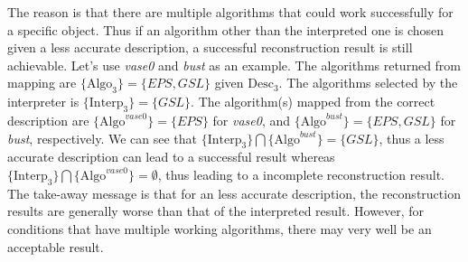 The reason is that there are multiple algorithms that could work successfully for a specific object. Thus if an algorithm other than the interpreted one is chosen given a less accurate description, a successful reconstruction result is still achievable. Let's use \textit{vase0} and \textit{bust} as an example. The algorithms returned from mapping are $\{\text{Algo}_3\}=\{EPS, GSL\}$ given $\text{Desc}_3$. The algorithms selected by the interpreter is $\{\text{Interp}_3\}=\{GSL\}$. The algorithm(s) mapped from the correct description are $\{\text{Algo}^{vase0}\}=\{EPS\}$ for \textit{vase0}, and $\{\text{Algo}^{bust}\}=\{EPS, GSL\}$ for \textit{bust}, respectively. We can see that $\{\text{Interp}_3\} \bigcap \{\text{Algo}^{bust}\} = \{GSL\}$, thus a less accurate description can lead to a successful result whereas $\{\text{Interp}_3\} \bigcap \{\text{Algo}^{vase0}\} = \emptyset$, thus leading to a incomplete reconstruction result. The take-away message is that for an less accurate description, the reconstruction results are generally worse than that of the interpreted result. However, for conditions that have multiple working algorithms, there may very well be an acceptable result.

